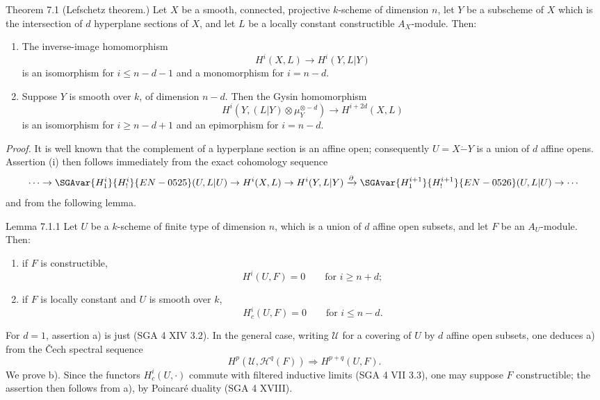 \begin{statement}{Theorem 7.1}
(Lefschetz theorem.) Let $X$ be a smooth, connected, projective $k$-scheme of dimension $n$, let $Y$ be a subscheme of $X$ which is the intersection of $d$ hyperplane sections of $X$, and let $L$ be a locally constant constructible $A_X$-module. Then:
\begin{enumerate}[label=(\roman*)]
\item The inverse-image homomorphism
\[
H^i(X,L)\to H^i(Y,L|Y)
\]
is an isomorphism for $i\le n-d-1$ and a monomorphism for $i=n-d$.
\item Suppose $Y$ is smooth over $k$, of dimension $n-d$. Then the Gysin homomorphism
\[
H^i(Y,(L|Y)\otimes\mu_Y^{\otimes -d})\to H^{i+2d}(X,L)
\]
is an isomorphism for $i\ge n-d+1$ and an epimorphism for $i=n-d$.
\end{enumerate}
\end{statement}

\emph{Proof.} It is well known that the complement of a hyperplane section is an affine open; consequently $U=X\mathbin{\dot{-}}Y$ is a union of $d$ affine opens. Assertion (i) then follows immediately from the exact cohomology sequence
\[
\cdots\to \SGAvar{H_1^i}{H_!^i}{EN-0525}(U,L|U)\to H^i(X,L)\to H^i(Y,L|Y)
\xrightarrow{\partial} \SGAvar{H_1^{i+1}}{H_!^{i+1}}{EN-0526}(U,L|U)\to\cdots
\]
and from the following lemma.

\begin{statement}{Lemma 7.1.1}
Let $U$ be a $k$-scheme of finite type of dimension $n$, which is a union of $d$ affine open subsets, and let $F$ be an $A_U$-module. Then:
\begin{enumerate}[label=\alph*)]
\item if $F$ is constructible,
\[
H^i(U,F)=0\qquad\text{for }i\ge n+d;
\]
\item if $F$ is locally constant and $U$ is smooth over $k$,
\[
H^i_c(U,F)=0\qquad\text{for }i\le n-d.
\]
\end{enumerate}
\end{statement}

For $d=1$, assertion a) is just (SGA 4 XIV 3.2). In the general case, writing $\mathcal U$ for a covering of $U$ by $d$ affine open subsets, one deduces a) from the Čech spectral sequence
\[
H^p(\mathcal U,\mathcal H^q(F))\Rightarrow H^{p+q}(U,F).
\]
We prove b). Since the functors $H_c^i(U,\cdot)$ commute with filtered inductive limits (SGA 4 VII 3.3), one may suppose $F$ constructible; the assertion then follows from a), by Poincaré duality (SGA 4 XVIII).

